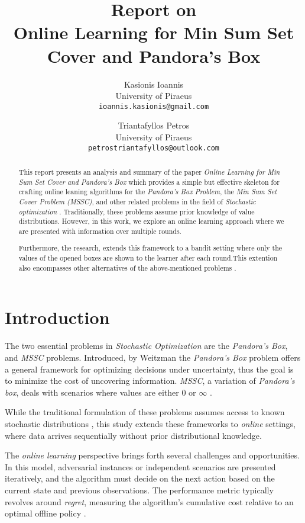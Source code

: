 \documentclass[11pt,a4paper]{article}
\title{Report on \\ \textbf{Online Learning for Min Sum Set Cover and Pandora's Box}}
\author{
    Kasionis Ioannis \\ University of Piraeus \\ \texttt{ioannis.kasionis@gmail.com}
    \and
    Triantafyllos Petros \\ University of Piraeus \\ \texttt{petrostriantafyllos@outlook.com}
}
\date{}
\begin{document}
\maketitle

\begin{abstract}
This report presents an analysis and summary of the paper \textit{Online Learning for Min Sum Set Cover and Pandora's Box} which provides a simple but effective skeleton for crafting online leaning algorithms for the \textit{Pandora's Box Problem}, the \textit{Min Sum Set Cover Problem (MSSC)}, and other related problems in the field of \textit{Stochastic optimization} \cite{gergatsouli2022online}. Traditionally, these problems assume prior knowledge of value distributions. However, in this work, we explore an online learning approach where we are presented with information over multiple rounds. \par 
Furthermore, the research, extends this framework to a bandit setting where only the values of the opened boxes are shown to the learner after each round.This extention also encompasses other alternatives of the above-mentioned problems \cite{gergatsouli2022online}.
\end{abstract}
\pagebreak

\section{Introduction}
The two essential problems in \textit{Stochastic Optimization} are the \textit{Pandora's Box}, and \textit{MSSC} problems.
Introduced, by Weitzman \cite{weitzman1978optimal} the \textit{Pandora's Box} problem offers a general framework for optimizing decisions under uncertainty, thus the goal is to minimize the cost of uncovering information.
\textit{MSSC}, a variation of \textit{Pandora's box}, deals with scenarios where values are either $0$ or $\infty$ \cite{feige2004approximating}. \par
While the traditional formulation of these problems assumes access to known stochastic distributions \cite{gergatsouli2022online}, this study extends these frameworks to \textit{online} settings, where data arrives sequentially without prior distributional knowledge. \par
The \textit{online learning} perspective brings forth several challenges and opportunities. In this model, adversarial instances or independent scenarios are presented iteratively, and the algorithm must decide on the next action based on the current state and previous observations. The performance metric typically revolves around \textit{regret}, measuring the algorithm's cumulative cost relative to an optimal offline policy \cite{shalev2012online}.
\newline
\end{document}
